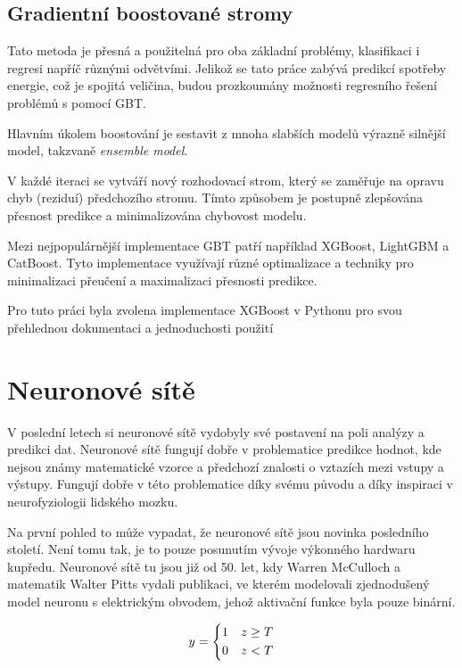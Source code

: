 \documentclass[FM,BP,fonts]{tulthesis}
\begin{document}
\subsection{Gradientní boostované stromy}
Tato metoda je přesná a použitelná pro oba základní problémy, klasifikaci i regresi napříč různými odvětvími. Jelikož se tato práce zabývá predikcí spotřeby energie, což je spojitá veličina, budou prozkoumány možnosti regresního řešení problémů s pomocí GBT.

Hlavním úkolem boostování je sestavit z mnoha slabších modelů výrazně silnější model, takzvaně \textit{ensemble  model}. \cite{chen2016xgboost}

V každé iteraci se vytváří nový rozhodovací strom, který se zaměřuje na opravu chyb (reziduí) předchozího stromu. Tímto způsobem je postupně zlepšována přesnost predikce a minimalizována chybovost modelu. 

Mezi nejpopulárnější implementace GBT patří například XGBoost, LightGBM a CatBoost. Tyto implementace využívají různé optimalizace a techniky pro minimalizaci přeučení a maximalizaci přesnosti predikce.

Pro tuto práci byla zvolena implementace XGBoost v Pythonu pro svou přehlednou dokumentaci a jednoduchosti použití


\section{Neuronové sítě}
V poslední letech si neuronové sítě vydobyly své postavení na poli analýzy a predikci dat. Neuronové sítě fungují dobře v problematice predikce hodnot, kde nejsou známy matematické vzorce a předchozí znalosti o vztazích mezi vstupy a výstupy. Fungují dobře v této problematice díky svému původu a díky inspiraci v neurofyziologii lidského mozku.

Na první pohled to může vypadat, že neuronové sítě jsou novinka posledního století. Není tomu tak, je to pouze posunutím vývoje výkonného hardwaru kupředu. Neuronové sítě tu jsou již od 50. let, kdy Warren McCulloch a matematik Walter Pitts vydali publikaci, ve kterém modelovali zjednodušený model neuronu s elektrickým obvodem, jehož aktivační funkce byla pouze binární. \cite{mcculloch1943logical}

\begin{equation}
	y = \begin{dcases}
		1 & z \geq T \\
		0 & z < T
	\end{dcases}
\end{equation}
\end{document}
